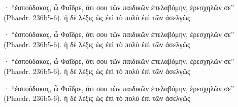 \documentclass[11pt,a4paper]{book}
\begin{document}
\begin{pages}
\begin{Rightside}
\beginnumbering

 \pstart {}· “ἐσπούδακας, ὦ Φαῖδρε, ὅτι σου τῶν παιδικῶν ἐπελαβόμην, ἐρεσχηλῶν σε” (Phaedr. 236b5-6). ἡ δὲ λέξις ὡς ἐπὶ τὸ πολὺ ἐπὶ τῶν ἀσελγῶς\pend

\numberpstartfalse

\endnumbering
\end{Rightside}
\begin{Leftside}
\beginnumbering

 \pstart {}· “ἐσπούδακας, ὦ Φαῖδρε, ὅτι σου τῶν παιδικῶν ἐπελαβόμην, ἐρεσχηλῶν σε” (Phaedr. 236b5-6). ἡ δὲ λέξις ὡς ἐπὶ τὸ πολὺ ἐπὶ τῶν ἀσελγῶς\pend

\numberpstartfalse

\endnumbering
\end{Leftside}
\begin{Leftside}
\beginnumbering

 \pstart {}· “ἐσπούδακας, ὦ Φαῖδρε, ὅτι σου τῶν παιδικῶν ἐπελαβόμην, ἐρεσχηλῶν σε” (Phaedr. 236b5-6). ἡ δὲ λέξις ὡς ἐπὶ τὸ πολὺ ἐπὶ τῶν ἀσελγῶς\pend

\numberpstartfalse

\endnumbering
\end{Leftside}
\Pages
\end{pages}
\beginnumbering

 \pstart {}· “ἐσπούδακας, ὦ Φαῖδρε, ὅτι σου τῶν παιδικῶν ἐπελαβόμην, ἐρεσχηλῶν σε” (Phaedr. 236b5-6). ἡ δὲ λέξις ὡς ἐπὶ τὸ πολὺ ἐπὶ τῶν ἀσελγῶς\pend
\numberpstartfalse

\endnumbering
\end{document}
